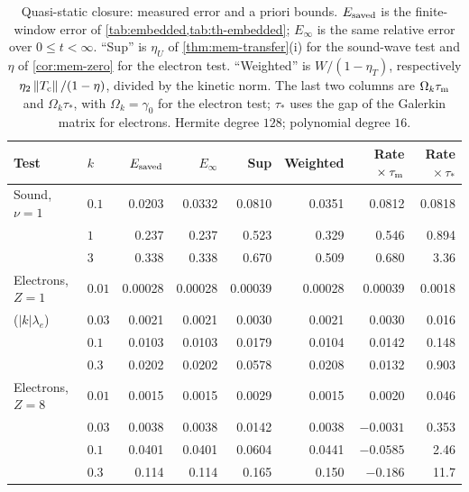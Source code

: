 \documentclass[11pt]{article}
\newcommand{\norm}[1]{\left\|#1\right\|}
\theoremstyle{definition}
\theoremstyle{remark}
\numberwithin{equation}{section}
\begin{document}
\begin{table}[tb]
\centering
\caption{Quasi-static closure: measured error and a priori bounds.
$E_{\rm saved}$ is the finite-window error of
\cref{tab:embedded,tab:th-embedded}; $E_\infty$ is the same relative error
over $0\leq t<\infty$. ``Sup'' is $\eta_U$ of \cref{thm:mem-transfer}(i)
for the sound-wave test and $\eta$ of \cref{cor:mem-zero} for the
electron test. ``Weighted'' is $W/(1-\eta_T)$, respectively
$\eta_2\norm{T_{\rm c}}/(1-\eta)$, divided by the kinetic norm. The last
two columns are $\Omega_k\tau_{\rm m}$ and $\Omega_k\tau_*$, with
$\Omega_k=\gamma_0$ for the electron test; $\tau_*$ uses the gap of the
Galerkin matrix for electrons. Hermite degree $128$; polynomial degree
$16$.}
\label{tab:mem-bounds}
\small
\begin{tabular}{llrrrrrr}\toprule
Test & $k$ & $E_{\rm saved}$ & $E_\infty$ & Sup & Weighted
 & Rate${}\times\tau_{\rm m}$ & Rate${}\times\tau_*$\\\midrule
Sound, $\nu=1$ & $0.1$ & 0.0203 & 0.0332 & 0.0810 & 0.0351 & 0.0812 & 0.0818\\
               & $1$   & 0.237 & 0.237 & 0.523 & 0.329 & 0.546 & 0.894\\
               & $3$   & 0.338 & 0.338 & 0.670 & 0.509 & 0.680 & 3.36\\\midrule
Electrons, $Z=1$ & $0.01$ & 0.00028 & 0.00028 & 0.00039 & 0.00028 & 0.00039 & 0.0018\\
 ($|k|\lambda_e$) & $0.03$ & 0.0021 & 0.0021 & 0.0030 & 0.0021 & 0.0030 & 0.016\\
                 & $0.1$  & 0.0103 & 0.0103 & 0.0179 & 0.0104 & 0.0142 & 0.148\\
                 & $0.3$  & 0.0202 & 0.0202 & 0.0578 & 0.0208 & 0.0132 & 0.903\\\midrule
Electrons, $Z=8$ & $0.01$ & 0.0015 & 0.0015 & 0.0029 & 0.0015 & 0.0020 & 0.046\\
                 & $0.03$ & 0.0038 & 0.0038 & 0.0142 & 0.0038 & $-0.0031$ & 0.353\\
                 & $0.1$  & 0.0401 & 0.0401 & 0.0604 & 0.0441 & $-0.0585$ & 2.46\\
                 & $0.3$  & 0.114 & 0.114 & 0.165 & 0.150 & $-0.186$ & 11.7\\
\bottomrule\end{tabular}
\end{table}
\end{document}
